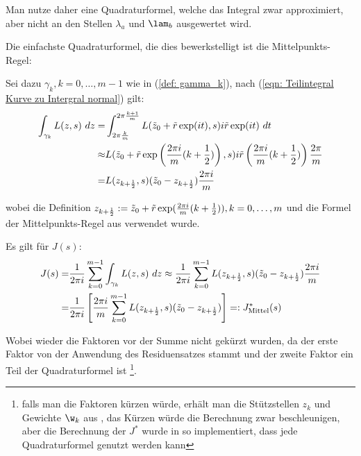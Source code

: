 \documentclass[a4paper,12pt]{report}
\newcommand{\zitat}[1]{\glqq #1\grqq}
\newcommand{\klammer}[1]{\left(#1\right)}
\newcommand{\1}{\mathds{1}}
\theoremstyle{plain} %
\theoremstyle{definition} %
\theoremstyle{remark}
\begin{document}
            Man nutze daher eine Quadraturformel, welche das Integral zwar approximiert, aber nicht an den Stellen $\lambda_a$ und $\lam_b$ ausgewertet wird.

            Die einfachste Quadraturformel, die dies bewerkstelligt ist die \zitat{Mittelpunkts-Regel}\cite[S. 526]{numerikHermann}:

            Sei dazu $\gamma_k, k=0,\dots,m-1$ wie in (\ref{def: gamma_k}), nach (\ref{eqn: Teilintegral Kurve zu Intergral normal}) gilt:
            \begin{align*}
                  \int_{\gamma_k} L(z, s)\ dz =& \int_{2\pi \frac{k}{m}}^{2\pi\frac{k+1}{m}}L(\Tilde z_0+\Tilde r\exp(it), s)i\Tilde r \exp(it)\ dt\\
                  \approx& L(\Tilde z_0+\Tilde r\exp\klammer{\frac{2\pi i}{m}(k+\frac{1}{2})}, s)i\Tilde r \klammer{\frac{2\pi i}{m}(k+\frac{1}{2})} \frac{2\pi}{m}\\
                  =& L(z_{k+\frac{1}{2}}, s)(\Tilde z_0-z_{k+\frac{1}{2}}) \frac{2\pi i}{m}
            \end{align*}

            wobei die Definition $z_{k+\frac{1}{2}}:= \Tilde z_0+\Tilde r\exp(\frac{2\pi i}{m}(k+\frac{1}{2})), k=0,\dots,m$
            und die Formel der Mittelpunkts-Regel aus \cite[S. 526]{numerikHermann} verwendet wurde.

            Es gilt für $J(s)$:
            \begin{align}
                  J(s) =& \frac{1}{2\pi i}\sum_{k=0}^{m-1} \int_{\gamma_k} L(z, s)\ dz \approx \frac{1}{2\pi i}\sum_{k=0}^{m-1} L(z_{k+\frac{1}{2}}, s)(\Tilde z_0-z_{k+\frac{1}{2}}) \frac{2\pi i}{m}\nonumber\\
                  =&  \frac{1}{2\pi i}\left[\frac{2\pi i}{m}\sum_{k=0}^{m-1} L(z_{k+\frac{1}{2}}, s)(\Tilde z_0-z_{k+\frac{1}{2}})\right]=:J^*_{\text{Mittel}}(s)\label{def: JSternMittel}
            \end{align}

            Wobei wieder die Faktoren vor der Summe nicht gekürzt wurden, da der erste Faktor von der Anwendung des Residuensatzes stammt
            und der zweite Faktor ein Teil der Quadraturformel ist
            \footnote{falls man die Faktoren kürzen würde, erhält man die Stützstellen $z_k$ und Gewichte $\w_k$ aus \cite[S. 128]{grundlageFutamura},
            das Kürzen würde die Berechnung zwar beschleunigen, aber die Berechnung der $J^*$ wurde in \cite[\textit{./Funktionen.py}]{github} so implementiert, dass jede Quadraturformel genutzt werden kann}.
\end{document}
